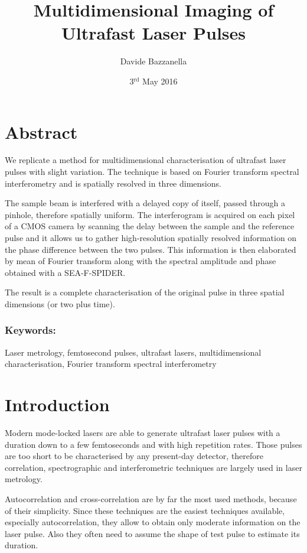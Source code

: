 \documentclass[12pt,a4paper,twoside]{article}
\author{Davide Bazzanella}
\title{Multidimensional Imaging of Ultrafast Laser Pulses}
\date{3$^{\mathrm{rd}}$ May 2016}
\begin{document}

\cleardoublepage
\section*{Abstract}
We replicate a method for multidimensional characterisation of ultrafast laser pulses with slight variation.
The technique is based on Fourier transform spectral interferometry and is spatially resolved in three dimensions.

The sample beam is interfered with a delayed copy of itself, passed through a pinhole, therefore spatially uniform.
The interferogram is acquired on each pixel of a CMOS camera by scanning the delay between the sample and the reference pulse and it allows us to gather high-resolution spatially resolved information on the phase difference between the two pulses.
This information is then elaborated by mean of Fourier transform along with the spectral amplitude and phase obtained with a SEA-F-SPIDER.

The result is a complete characterisation of the original pulse in three spatial dimensions (or two plus time).
\subsubsection*{Keywords:} Laser metrology, femtosecond pulses, ultrafast lasers, multidimensional characterisation, Fourier transform spectral interferometry
\cleardoublepage
\tableofcontents

\cleardoublepage
{}
\section{Introduction}
Modern mode-locked lasers are able to generate ultrafast laser pulses with a duration down to a few femtoseconds \cite{tamura93,schriever14,yu30} and with high repetition rates.
Those pulses are too short to be characterised by any present-day detector, therefore correlation, spectrographic and interferometric techniques are largely used in laser metrology.

Autocorrelation and cross-correlation are by far the most used methods, because of their simplicity.
Since these techniques are the easiest techniques available, especially autocorrelation, they allow to obtain only moderate information on the laser pulse.
Also they often need to assume the shape of test pulse to estimate its duration.
\end{document}
